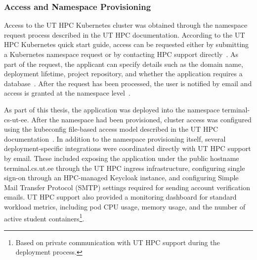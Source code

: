 \subsubsection{Access and Namespace Provisioning} \label{subsubsec:access-and-namespace-provisioning}
Access to the UT HPC Kubernetes cluster was obtained through the namespace request process described in the UT HPC documentation.
According to the UT HPC Kubernetes quick start guide, access can be requested either by submitting a Kubernetes namespace request or by contacting HPC support directly~\cite{ut_hpc_kubernetes_quick_start_2026}.
As part of the request, the applicant can specify details such as the domain name, deployment lifetime, project repository, and whether the application requires a database~\cite{ut_hpc_container_hosting_form}.
After the request has been processed, the user is notified by email and access is granted at the namespace level~\cite{ut_hpc_kubernetes_quick_start_2026}.

As part of this thesis, the application was deployed into the namespace terminal-cs-ut-ee.
After the namespace had been provisioned, cluster access was configured using the kubeconfig file-based access model described in the UT HPC documentation~\cite{ut_hpc_kubernetes_quick_start_2026}.
In addition to the namespace provisioning itself, several deployment-specific integrations were coordinated directly with UT HPC support by email.
These included exposing the application under the public hostname terminal.cs.ut.ee through the UT HPC ingress infrastructure, configuring single sign-on through an HPC-managed Keycloak instance, and configuring Simple Mail Transfer Protocol (SMTP) settings required for sending account verification emails.
UT HPC support also provided a monitoring dashboard for standard workload metrics, including pod CPU usage, memory usage, and the number of active student containers\footnote{Based on private communication with UT HPC support during the deployment process.}.

